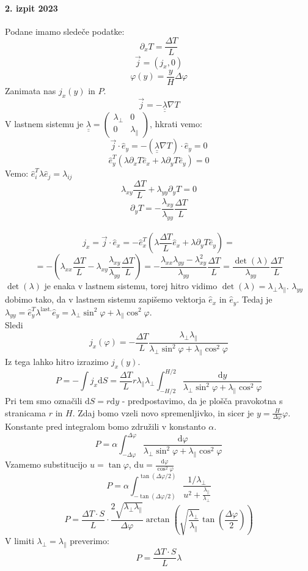 \documentclass[a4paper]{article}
\newcommand{\vct}[1]{\overrightarrow{#1}}
\newcommand{\dif}{\mathrm{d}}
\newcommand{\duline}[1]{\underline{\underline{#1}}}
\begin{document}
\paragraph{2. izpit 2023} Podane imamo sledeče podatke:
$$\partial_xT = \frac{\Delta T}{L}$$
$$\vct{j} = (j_x, 0)$$
$$\varphi(y) = \frac{y}{H}\Delta\varphi$$
Zanimata nas $j_x(y)$ in $P$.
$$\vct{j} = -\duline{\lambda} \nabla T$$
V lastnem sistemu je $\displaystyle{\duline{\lambda} = \begin{pmatrix}
    \lambda_\perp & 0 \\
    0 & \lambda_\parallel
\end{pmatrix}}$, hkrati vemo:
$$\vct{j}\cdot\widehat{e}_y = - (\duline{\lambda} \nabla T)\cdot\widehat{e}_y = 0$$
$$\widehat{e}_y^T\left(\lambda \partial_xT\widehat{e}_x + \lambda\partial_yT\widehat{e}_y\right) = 0$$
Vemo: $\hat{e}_i^T\lambda \hat{e}_j = \lambda_{ij}$
$$\lambda_{xy} \frac{\Delta T}{L} + \lambda_{yy} \partial_yT = 0$$
$$\partial_yT = -\frac{\lambda_{xy}}{\lambda_{yy}}\frac{\Delta T}{L}$$
\\
$$j_x = \vct{j}\cdot\widehat{e}_x = -\widehat{e}_x^T\left(\lambda\frac{\Delta T}{L}\widehat{e}_x + \lambda\partial_yT\widehat{e}_y\right) =$$
$$= -\left(\lambda_{xx} \frac{\Delta T}{L} - \lambda_{xy}\frac{\lambda_{xy}}{\lambda_{yy}} \frac{\Delta T}{L}\right) = -\frac{\lambda_{xx}\lambda_{yy} - \lambda_{xy}^2}{\lambda_{yy}}\frac{\Delta T}{L} = \frac{\det(\lambda)}{\lambda_{yy}}\frac{\Delta T}{L}$$
$\det(\lambda)$ je enaka v lastnem sistemu, torej hitro vidimo $\det(\lambda) = \lambda_\perp \lambda_\parallel$. $\lambda_{yy}$ dobimo tako, da v lastnem sistemu zapišemo vektorja $\widehat{e}_x$ in $\widehat{e}_y$.
Tedaj je $\lambda_{yy} = \widehat{e}^T_{y}\lambda^{\text{last.}}\widehat{e}_y = \lambda_\perp \sin^2\varphi + \lambda_\parallel \cos^2\varphi$. \\
Sledi $$j_x(\varphi) = -\frac{\Delta T}{L}\frac{\lambda_\perp\lambda_\parallel}{\lambda_\perp \sin^2\varphi + \lambda_\parallel \cos^2\varphi}$$
Iz tega lahko hitro izrazimo $j_x(y)$. \\
$$P = -\int j_x\dif S = \frac{\Delta T}{L} r\lambda_\parallel\lambda_\perp \int_{-H/2}^{H/2}\frac{\dif y}{\lambda_\perp \sin^2\varphi + \lambda_\parallel\cos^2\varphi}$$
Pri tem smo označili $\dif S = r \dif y$ - predpostavimo, da je plošča pravokotna s stranicama $r$ in $H$. Zdaj bomo vzeli novo spremenljivko, in sicer je $\displaystyle{y = \frac{H}{\Delta \varphi} \varphi}$. Konstante pred integralom bomo združili v konstanto $\alpha$.
$$P = \alpha \int_{-\Delta\varphi}^{\Delta\varphi}\frac{\dif \varphi}{\lambda_\perp\sin^2\varphi + \lambda_\parallel\cos^2\varphi}$$
Vzamemo substitucijo $u = \tan\varphi$, $\displaystyle{\dif u = \frac{\dif\varphi}{\cos^2\varphi}}$
$$P = \alpha \int_{-\tan(\Delta\varphi/2)}^{\tan(\Delta\varphi/2)}\frac{1 / \lambda_\perp}{u^2 + \frac{\lambda_\parallel}{\lambda_\perp}}$$
$$P = \frac{\Delta T \cdot S}{L} \cdot \frac{2\sqrt{\lambda_\perp\lambda_\parallel}}{\Delta\varphi} \arctan\left(\sqrt{\frac{\lambda_\perp}{\lambda_\parallel}}\tan\left(\frac{\Delta\varphi}{2}\right)\right)$$
V limiti $\lambda_\perp = \lambda_\parallel$ preverimo:
$$P = \frac{\Delta T \cdot S}{L}\lambda$$
\end{document}
